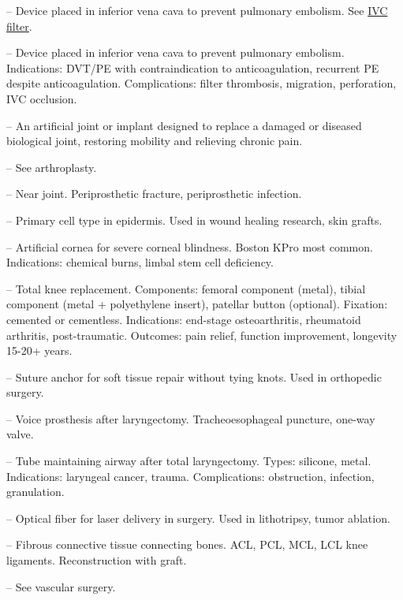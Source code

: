 -- Device placed in inferior vena cava to prevent pulmonary embolism. See \hyperlink{IVC Filter}{IVC filter}.

-- Device placed in inferior vena cava to prevent pulmonary embolism. Indications: DVT/PE with contraindication to anticoagulation, recurrent PE despite anticoagulation. Complications: filter thrombosis, migration, perforation, IVC occlusion.

-- An artificial joint or implant designed to replace a damaged or diseased biological joint, restoring mobility and relieving chronic pain.

-- See arthroplasty.

-- Near joint. Periprosthetic fracture, periprosthetic infection.


-- Primary cell type in epidermis. Used in wound healing research, skin grafts.

-- Artificial cornea for severe corneal blindness. Boston KPro most common. Indications: chemical burns, limbal stem cell deficiency.


-- Total knee replacement. Components: femoral component (metal), tibial component (metal + polyethylene insert), patellar button (optional). Fixation: cemented or cementless. Indications: end-stage osteoarthritis, rheumatoid arthritis, post-traumatic. Outcomes: pain relief, function improvement, longevity 15-20+ years.

-- Suture anchor for soft tissue repair without tying knots. Used in orthopedic surgery.

-- Voice prosthesis after laryngectomy. Tracheoesophageal puncture, one-way valve.


-- Tube maintaining airway after total laryngectomy. Types: silicone, metal. Indications: laryngeal cancer, trauma. Complications: obstruction, infection, granulation.

-- Optical fiber for laser delivery in surgery. Used in lithotripsy, tumor ablation.

-- Fibrous connective tissue connecting bones. ACL, PCL, MCL, LCL knee ligaments. Reconstruction with graft.

-- See vascular surgery.

